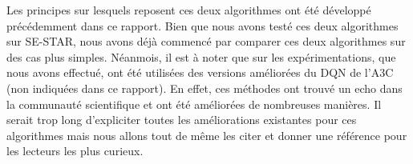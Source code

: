 Les principes sur lesquels reposent ces deux algorithmes ont été développé précédemment dans ce rapport. Bien que nous avons testé ces deux algorithmes sur SE-STAR, nous avons déjà commencé par comparer ces deux algorithmes sur des cas plus simples. Néanmois, il est à noter que sur les expérimentations, que nous avons effectué, ont été utilisées des versions améliorées du DQN de l'A3C (non indiquées dans ce rapport). En effet, ces méthodes ont trouvé un echo dans la communauté scientifique et ont été améliorées de nombreuses manières. Il serait trop long d'expliciter toutes les améliorations existantes pour ces algorithmes mais nous allons tout de même les citer et donner une référence pour les lecteurs les plus curieux.


\setlength{\arrayrulewidth}{.45mm}
\setlength{\tabcolsep}{12pt}
\renewcommand{\arraystretch}{2.}

